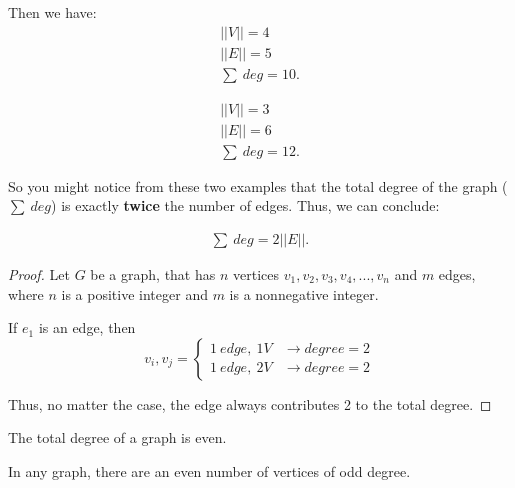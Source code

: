\documentclass{report}
\begin{document}
    \begin{minipage}{0.47\textwidth}
    \end{minipage}
    \begin{minipage}{0.47\textwidth}
    Then we have:
    \begin{align*}
        ||V|| = 4 \\
        ||E|| = 5 \\
        \sum\ deg = 10
    .\end{align*}
    \end{minipage}
    \bigbreak \noindent 
    \begin{minipage}{0.47\textwidth}
    \end{minipage}
    \begin{minipage}{0.47\textwidth}
        \begin{align*}
            ||V|| = 3 \\
            ||E|| = 6\\
            \sum\ deg = 12
        .\end{align*}
    \end{minipage}
    \bigbreak \noindent 
    So you might notice from these two examples that the total degree of the graph ($\sum\ deg$) is exactly \textbf{twice} the number of edges. Thus, we can conclude:
    \bigbreak \noindent 
    \pagebreak \bigbreak \noindent  
    \begin{thm}
       \begin{align*}
           \sum\ deg = 2||E||
       .\end{align*} 
    \end{thm}
    \bigbreak \noindent 
    \begin{proof}
       Let $G$ be a graph, that has $n$ vertices $v_{1},v_{2},v_{3},v_{4},...,v_{n}$ and $m$ edges, where $n$ is a positive integer and $m$ is a nonnegative integer.
       \bigbreak \noindent 

       If $e_{1}$ is an edge, then 
          \begin{equation}
           v_{i},v_{j}=
               \begin{cases}
                     1\ edge,\ 1V & \rightarrow degree = 2  \\
                    1\ edge,\ 2V & \rightarrow degree =  2  
               \end{cases}
           \end{equation}
           \bigbreak \noindent 

        Thus, no matter the case, the edge always contributes 2 to the total degree.
    \end{proof}
    \bigbreak \noindent 
    \begin{cor}
      The total degree of a graph is even. 
    \end{cor}
    \smallbreak \noindent
    \begin{cor}
       In any graph, there are an even number of vertices of odd degree.
    \end{cor}
\end{document}
